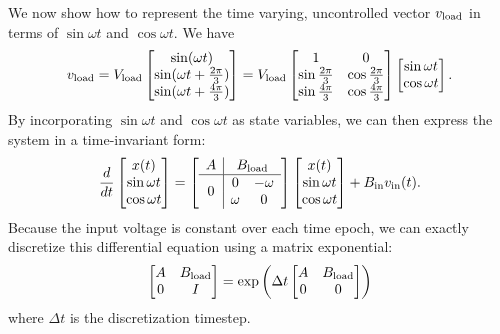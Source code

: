 \documentclass[12pt]{article}
\begin{document}
We now show how to represent the time varying, uncontrolled vector
$v_{\rm load}$ in terms of $\sin \omega t$ and $\cos \omega t$.
We have
\[
v_{\rm load} 
= 
V_{\rm load}
\begin{bmatrix}
\sin (\omega t) \\ 
\sin (\omega t + \frac{2\pi}{3}) \\ 
\sin (\omega t + \frac{4\pi}{3}) \\ 
\end{bmatrix}
= 
V_{\rm load}
\begin{bmatrix}
1 & 0 \\ 
\sin\frac{2\pi}{3} & \cos\frac{2\pi}{3} \\
\sin\frac{4\pi}{3} & \cos\frac{4\pi}{3} \\
\end{bmatrix}
\begin{bmatrix}
\sin \omega t \\ 
\cos \omega t \\ 
\end{bmatrix}.
\]
By incorporating $\sin \omega t$ and $\cos \omega t$ as state variables,
we can then express the system in a time-invariant form:
\begin{align*}
\frac{d}{dt} \begin{bmatrix} x(t) \\ \sin \omega t \\ \cos\omega t \end{bmatrix}
=
\left[ \begin{array}{c|cc}
A & \multicolumn{2}{c}{B_{\rm load}} \\
\hline
\multirow{2}{*}{0} & 0 & -\omega \\
& \omega & 0
\end{array} \right]
\begin{bmatrix} x(t) \\ \sin \omega t \\ \cos\omega t \end{bmatrix}
+
B_{\rm in} v_{\rm in}(t).
\end{align*}
Because the input voltage is constant over each time epoch,
we can exactly discretize this differential equation using a matrix exponential:
\[
\begin{bmatrix}
A & B_{\rm load} \\
0 & I
\end{bmatrix}
=
\exp\left(
\Delta t
\begin{bmatrix}
A & B_{\rm load} \\
0 & 0
\end{bmatrix}
\right)
\]
where $\Delta t$ is the discretization timestep.
\end{document}
